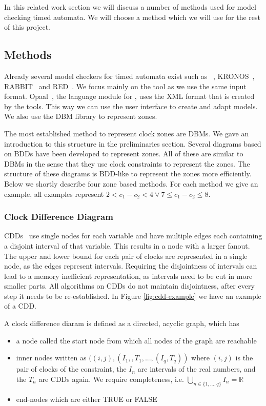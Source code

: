 In this related work section we will discuss a number of methods used for model checking timed automata. We will choose a method which we will use for the rest of this project.

\subsection{Methods}
Already several model checkers for timed automata exist such as \uppaal{}~\cite{UPPAAL}, KRONOS~\cite{kronos}, RABBIT~\cite{CAV03} and RED~\cite{crds}. We focus mainly on the \uppaal{} tool as we use the same input format. Opaal~\cite{opaal}, the language module for \ltsmin{}, uses the XML format that is created by the \uppaal{} tools. This way we can use the \uppaal{} user interface to create and adapt models. We also use the \uppaal{} DBM library to represent zones.

The most established method to represent clock zones are DBMs. We gave an introduction to this structure in the preliminaries section. Several diagrams based on BDDs have been developed to represent zones. All of these are similar to DBMs in the sense that they use clock constraints to represent the zones. The structure of these diagrams is BDD-like to represent the zones more efficiently. Below we shortly describe four zone based methods. For each method we give an example, all examples represent $2 < c_1 - c_2 < 4 \vee 7 \leq c_1 - c_2 \leq 8$.

\subsubsection{Clock Difference Diagram}
CDDs~\cite{BRICS19491} use single nodes for each variable and have multiple edges each containing a disjoint interval of that variable. This results in a node with a larger fanout. The upper and lower bound for each pair of clocks are represented in a single node, as the edges represent intervals. Requiring the disjointness of intervals can lead to a memory inefficient representation, as intervals need to be cut in more smaller parts. All algorithms on CDDs do not maintain disjointness, after every step it needs to be re-established. In Figure \ref{fig:cdd-example} we have an example of a CDD.

\begin{mydef}
A clock difference diaram is defined as a directed, acyclic graph, which has
\begin{itemize}
\item a node called the start node from which all nodes of the graph are reachable
\item inner nodes written as $((i,j),(I_1,,T_1,...,(I_q,T_q))$ where $(i,j)$ is the pair of clocks of the constraint, the $I_n$ are intervals of the real numbers, and the $T_n$ are CDDs again. We require completeness, i.e. $\bigcup_{n\in \{1,...,q\}}I_n= \mathbb{R}$
\item end-nodes which are either TRUE or FALSE
\end{itemize}

\end{mydef}


